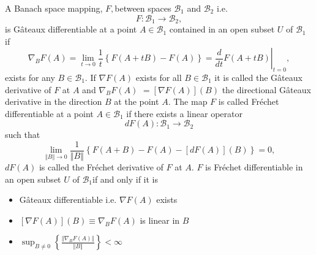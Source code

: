 \documentclass[aps,preprint]{revtex4}%
\begin{document}
\bigskip A Banach space mapping, $F,$between spaces $\mathcal{B}_{1}$ and
$\mathcal{B}_{2}$ i.e.
\begin{equation}
F:\mathcal{B}_{1}\rightarrow\mathcal{B}_{2},
\end{equation}
is G\^{a}teaux differentiable at a point $A\in\mathcal{B}_{1}$ contained in an
open subset $U$ of $\mathcal{B}_{1}$ if
\begin{equation}
\nabla_{B}F\left(  A\right)  =\lim_{t\rightarrow0}\frac{1}{t}\left\{  F\left(
A+tB\right)  -F\left(  A\right)  \right\}  =\left.  \frac{d}{dt}F\left(
A+tB\right)  \right\vert _{t=0},
\end{equation}
exists for any $B\in\mathcal{B}_{1}.$ If $\nabla F\left(  A\right)  $ exists
for all $B\in\mathcal{B}_{1}$ it is called the G\^{a}teaux derivative of $F$
at $A$ and $\nabla_{B}F\left(  A\right)  $ $=\left[  \nabla F\left(  A\right)
\right]  \left(  B\right)  $ the directional G\^{a}teaux derivative in the
direction $B$ at the point $A.$ The map $F$ is called Fr\'{e}chet
differentiable at a point $A\in\mathcal{B}_{1}$ if there exists a linear
operator
\begin{equation}
dF\left(  A\right)  :\mathcal{B}_{1}\rightarrow\mathcal{B}_{2}%
\end{equation}
such that
\begin{equation}
\lim_{\left\Vert B\right\Vert \rightarrow0}\frac{1}{\left\Vert B\right\Vert
}\left\{  F\left(  A+B\right)  -F\left(  A\right)  -\left[  dF\left(
A\right)  \right]  \left(  B\right)  \right\}  =0,
\end{equation}
$dF\left(  A\right)  $ is called the Fr\'{e}chet derivative of $F$ at $A.$ $F$
is Fr\'{e}chet differentiable in an open subset $U$ of $\mathcal{B}_{1}$if and
only if it is

\begin{itemize}
\item G\^{a}teaux differentiable i.e. $\nabla F\left(  A\right)  $ exists

\item $\left[  \nabla F\left(  A\right)  \right]  \left(  B\right)
\equiv\nabla_{B}F\left(  A\right)  $ is linear in $B$

\item $\sup_{B\neq0}\left\{  \frac{\left\Vert \nabla_{B}F\left(  A\right)
\right\Vert }{\left\Vert B\right\Vert }\right\}  <\infty$
\end{itemize}
\end{document}
